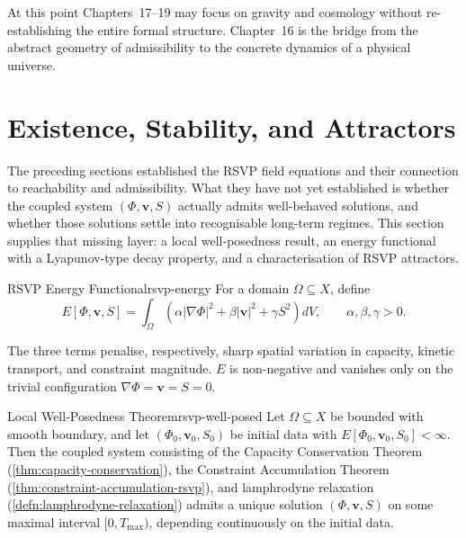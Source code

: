 \documentclass[12pt,twoside,openright]{book}
\begin{document}
At this point Chapters~17--19 may focus on gravity and
cosmology without re-establishing the entire formal
structure. Chapter~16 is the bridge from the abstract
geometry of admissibility to the concrete dynamics of a
physical universe.

\section{Existence, Stability, and Attractors}
\label{sec:ch16-existence}

The preceding sections established the RSVP field equations
and their connection to reachability and admissibility. What
they have not yet established is whether the coupled system
$(\Phi,\mathbf{v},S)$ actually admits well-behaved solutions,
and whether those solutions settle into recognisable
long-term regimes. This section supplies that missing layer:
a local well-posedness result, an energy functional with a
Lyapunov-type decay property, and a characterisation of RSVP
attractors.

\begin{definition}{RSVP Energy Functional}{rsvp-energy}
  For a domain $\Omega\subseteq X$, define
  \[
    E[\Phi,\mathbf{v},S]
    = \int_\Omega \left(
        \alpha|\nabla\Phi|^2
        + \beta|\mathbf{v}|^2
        + \gamma S^2
      \right) dV,
    \qquad \alpha,\beta,\gamma > 0.
  \]
\end{definition}

The three terms penalise, respectively, sharp spatial
variation in capacity, kinetic transport, and constraint
magnitude. $E$ is non-negative and vanishes only on the
trivial configuration $\nabla\Phi=\mathbf{v}=S=0$.

\begin{theorem}{Local Well-Posedness Theorem}{rsvp-well-posed}
  Let $\Omega\subseteq X$ be bounded with smooth boundary,
  and let $(\Phi_0,\mathbf{v}_0,S_0)$ be initial data with
  $E[\Phi_0,\mathbf{v}_0,S_0] < \infty$. Then the coupled
  system consisting of the Capacity Conservation Theorem
  (\cref{thm:capacity-conservation}), the Constraint
  Accumulation Theorem
  (\cref{thm:constraint-accumulation-rsvp}), and lamphrodyne
  relaxation (\cref{defn:lamphrodyne-relaxation}) admits a
  unique solution $(\Phi,\mathbf{v},S)$ on some maximal
  interval $[0,T_{\max})$, depending continuously on the
  initial data.
\end{theorem}
\end{document}
